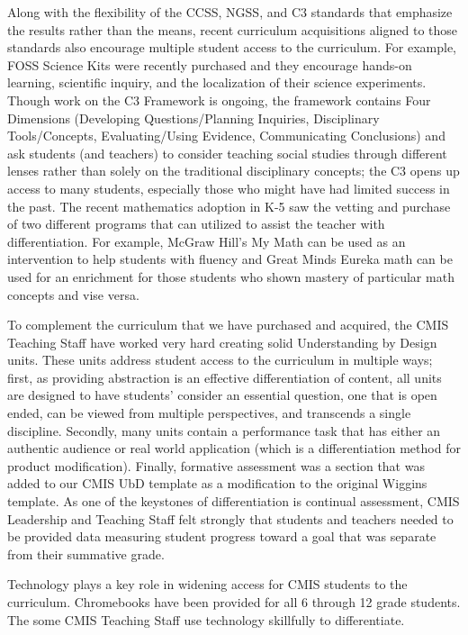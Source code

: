 \documentclass{report}
\begin{document}
\begin{findings}

Along with the flexibility of the CCSS, NGSS, and C3 standards that emphasize the results rather than the means, recent curriculum acquisitions aligned to those standards also encourage multiple student access to the curriculum. For example, FOSS Science Kits were recently purchased and they encourage hands-on learning, scientific inquiry, and the localization of their science experiments. Though work on the C3 Framework is ongoing, the framework contains Four Dimensions (Developing Questions/Planning Inquiries, Disciplinary Tools/Concepts, Evaluating/Using Evidence, Communicating Conclusions) and ask students (and teachers) to consider teaching social studies through different lenses rather than solely on the traditional disciplinary concepts; the C3 opens up access to many students, especially those who might have had limited success in the past. The recent mathematics adoption in K-5 saw the vetting and purchase of two different programs that can utilized to assist the teacher with differentiation. For example, McGraw Hill’s My Math can be used as an intervention to help students with fluency and Great Minds Eureka math can be used for an enrichment for those students who shown mastery of particular math concepts and vise versa. 


To complement the curriculum that we have purchased and acquired, the CMIS Teaching Staff have worked very hard creating solid Understanding by Design units. These units address student access to the curriculum in multiple ways; first, as providing abstraction is an effective differentiation of content, all units are designed to have students’ consider an essential question, one that is open ended, can be viewed from multiple perspectives, and transcends a single discipline. Secondly, many units contain a performance task that has either an authentic audience or real world application (which is a differentiation method for product modification). Finally, formative assessment was a section that was added to our CMIS UbD template as a modification to the original Wiggins template. As one of the keystones of differentiation is continual assessment, CMIS Leadership and Teaching Staff felt strongly that students and teachers needed to be provided data measuring student progress toward a goal that was separate from their summative grade. 

 
Technology plays a key role in widening access for CMIS students to the curriculum. Chromebooks have been provided  for all 6 through 12 grade students. The some CMIS Teaching Staff use technology skillfully to differentiate. 


\end{findings}
\end{document}
